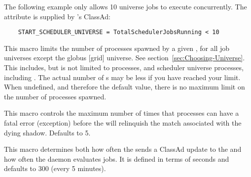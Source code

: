 \begin{description}
  The following example only allows 10  universe jobs to
  execute concurrently. The attribute 
  is supplied by 's ClassAd:
  
  \footnotesize
  \begin{verbatim}
    START_SCHEDULER_UNIVERSE = TotalSchedulerJobsRunning < 10
  \end{verbatim}
  \normalsize
  
  
\item[\Macro{MAX\_JOBS\_RUNNING}] \label{param:MaxJobsRunning} This
  macro limits the number of processes spawned by a given
  , for all job universes except the 
  globus [grid] universe.  See section~\ref{sec:Choosing-Universe}.
  This includes, but is not limited to  processes,
  and scheduler universe processes, including .
  The actual
  number of s may be less if you have reached
  your  limit.
  When undefined, and therefore the default value,
  there is no maximum limit on the number of processes spawned.

\item[\Macro{MAX\_SHADOW\_EXCEPTIONS}]
  \label{param:MaxShadowExceptions} This macro controls the maximum
  number of times that  processes can have a fatal
  error (exception) before the  will relinquish
  the match associated with the dying shadow.  Defaults to 5.

\item[\Macro{SCHEDD\_INTERVAL}] \label{param:ScheddInterval}  This
  macro determines both how often the  sends a ClassAd
  update to the  and how often the 
  daemon evaluates jobs.  It is defined in terms of seconds
  and defaults to 300 (every 5 minutes).




\end{description}
